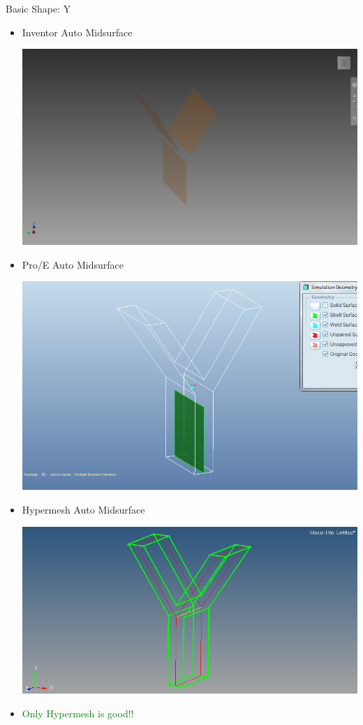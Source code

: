 \begin{frame}{Basic Shape: Y}
\begin{itemize}[noitemsep,label=\textbullet,topsep=2pt,parsep=2pt,partopsep=2pt]

\item Inventor Auto Midsurface

\includegraphics[scale=0.09]{../Common/images/Inventor_Y_Mids.png}

\item Pro/E Auto Midsurface

\includegraphics[scale=0.15]{../Common/images/ProeYautoPairs.png}

\item Hypermesh Auto Midsurface

\includegraphics[scale=0.18]{../Common/images/HypermeshYauto.png}

\item \textcolor{green}{Only Hypermesh is good!!}
\end{itemize}
\end{frame}
